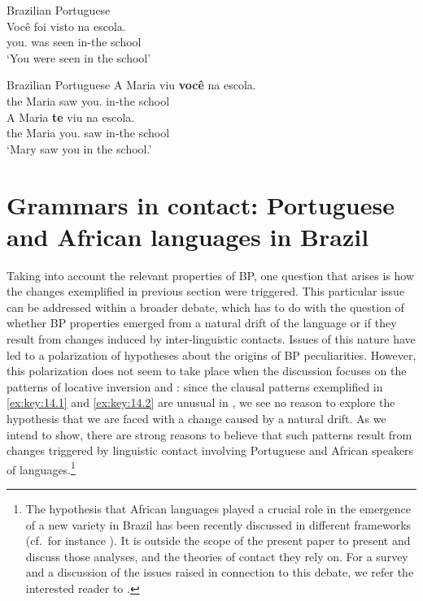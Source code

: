 \documentclass[output=paper]{langsci/langscibook}
\begin{document}
\ea%
    \label{ex:key:14.7}Brazilian Portuguese\\
    \gll    Você foi visto na escola.\\
            you.\Nom{} was seen in-the school\\
    \glt    ‘You were seen in the school’\\
\z

\ea%
    \label{ex:key:14.8}Brazilian Portuguese
	\ea
	\gll    A Maria viu \textbf{você} na escola.\\
            the Maria saw you.\Nom{} in-the school\\
    \ex
    \gll    A Maria \textbf{te} viu na escola.\\
            the Maria you.\Acc{} saw in-the school\\
    \glt    ‘Mary saw you in the school.’
    \z
\z

\section{Grammars in contact: Portuguese and African languages in
Brazil}\label{sec:key:14.3}

Taking into account the relevant properties of BP, one question that arises is
how the changes exemplified in previous section were triggered. This particular
issue can be addressed within a broader debate, which has to do with the
question of whether \gls{BP} properties emerged from a natural drift of the
language or if they result from changes induced by inter-linguistic contacts.
Issues of this nature have led to a polarization of hypotheses about the
origins of \gls{BP} peculiarities. However, this polarization does not seem to
take place when the discussion focuses on the patterns of locative inversion
and : since the clausal patterns exemplified in
\eqref{ex:key:14.1} and \eqref{ex:key:14.2} are unusual in , we see no reason
to explore the hypothesis that we are faced with a change caused by a natural
drift. As we intend to show, there are strong reasons to believe that such
patterns result from changes triggered by linguistic contact involving
Portuguese and African speakers of  languages.\footnote{The hypothesis
    that African languages played a crucial role in the emergence of a new
    variety in Brazil has been recently discussed in different frameworks (cf.\
    for instance \citealt{NegraoViotti2011}). It is outside the scope of
    the present paper to present and discuss those analyses, and the theories
    of contact they rely on. For a survey and a discussion of the issues raised
in connection to this debate, we refer the interested reader to
\citet{AvelarGalves2014}.}
\end{document}
